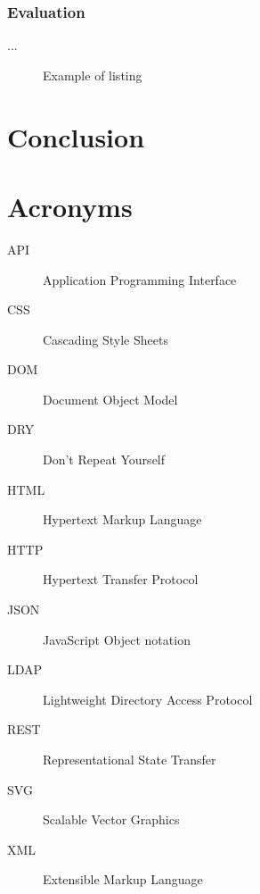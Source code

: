\documentclass[thesis=M,english,hidelinks]{FITthesis}[2012/10/20]
\begin{document}
    \subsection{Evaluation}

    ...

\begin{figure}[H]
  \setlength\fboxsep{0pt}
  \setlength\fboxrule{0.2pt}
  \caption{Example of listing}
  \label{fig:listing}
\end{figure}

\chapter{Conclusion}





\appendix

\chapter{Acronyms}

\begin{description}
  \item[API] Application Programming Interface
  \item[CSS] Cascading Style Sheets
  \item[DOM] Document Object Model
  \item[DRY] Don't Repeat Yourself
  \item[HTML] Hypertext Markup Language
  \item[HTTP] Hypertext Transfer Protocol
  \item[JSON] JavaScript Object notation
  \item[LDAP] Lightweight Directory Access Protocol
  \item[REST] Representational State Transfer
  \item[SVG] Scalable Vector Graphics
  \item[XML] Extensible Markup Language
\end{description}
\end{document}
